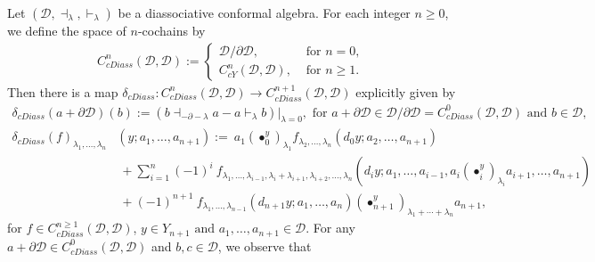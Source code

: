 \documentclass[a4paper,reqno,10pt]{amsart}
\theoremstyle{plain}
\theoremstyle{definition}
\theoremstyle{remark}
\newcommand{\C}{\mathbb{C}}
\newcommand{\D}{\mathcal{D}}
\newcommand{\p}{\partial}
\newcommand{\la}{\lambda}
\begin{document}
Let $(\D, \dashv_{\la}, \vdash_{\la})$ be a diassociative conformal algebra. For each integer $n \geq 0 $, we define the space of $n$-cochains by
 \begin{align*}
     C_{cDiass}^{n}(\D,\D) :=
     \begin{cases}
         \D/{\p \D},  & \text{ for } n=0, \\
         C_{cY}^{n}(\D,\D), &  \text{ for } n \geq 1.
     \end{cases}
 \end{align*}
Then there is a map $ \delta_{cDiass} : C_{cDiass}^{n}(\D,\D) \rightarrow C_{cDiass}^{n+1}(\D,\D)$ explicitly given by
\begin{align*}
\delta_{cDiass}(a + \p \D)( b) := (b \dashv_{-\p -\la} a - a \vdash _{\la} b) \big|_{ \la  = 0}, \text{ for } a + \p \D \in \D / \partial \D = C^0_{cDiass} (\D, \D) \text{ and } b \in \D,
\end{align*}
   \begin{align*}
{\delta_{cDiass}(f)}_{\la_{1}, \ldots, \la_{n}}&(y; a_1, \ldots , a_{n+1}) :=~ 
a_{1} (\bullet_{0}^{y})_{ \la_{1}}f_{ \la_{2}, \ldots, \la_{n}}(d_{0}y;  a_{2}, \ldots , a_{n+1}) \\& ~+ \sum_{i =1}^{n}(-1)^{i} ~ \! f_{ \la_{1}, \ldots , \la_{i-1}, \la_{i}+ \la_{i+1}, \la_{i+2}, \ldots , \la_{n}}(d_{i}y;  a_{1}, \ldots, a_{i-1},a_{i}(\bullet_{i}^{y})_{\la_{i}} a_{i+1}, \ldots, a_{n+1}) \\&
~+(-1)^{n+1} ~ \!  f_{\la_{1}, \ldots, \la_{n-1}}(d_{n+1}y; a_{1}, \ldots, a_{n})(\bullet_{n+1}^{y})_{\la_{1}+ \cdots+ \la_{n} }a_{n+1},
\end{align*}
for $f \in C_{cDiass}^{n \geq 1}(\D,\D)$, $ y \in Y_{n+1} \text{ and } a_1 , \ldots , a_{n+1} \in \D$. For any $ a + \p \D \in C^0_{cDiass} (\D, \D)$ and $b , c \in \D$, we observe that
\end{document}
